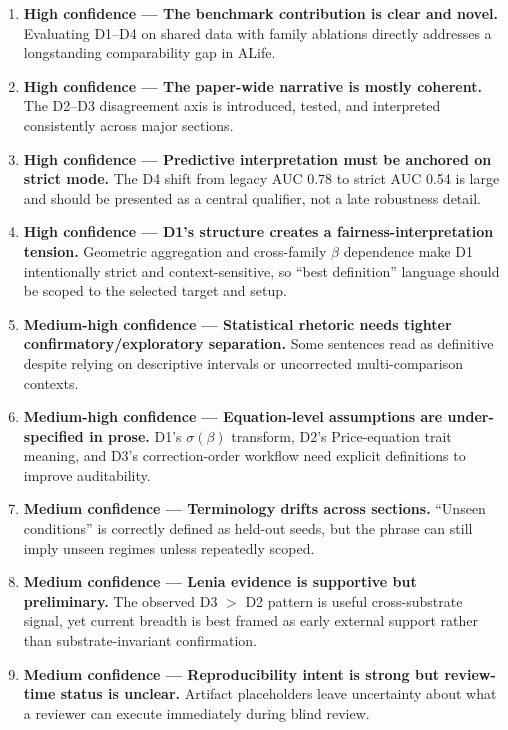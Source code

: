 \documentclass[11pt]{article}
\begin{document}
\begin{enumerate}
  \item \textbf{High confidence --- The benchmark contribution is clear and novel.} Evaluating D1--D4 on shared data with family ablations directly addresses a longstanding comparability gap in ALife.

  \item \textbf{High confidence --- The paper-wide narrative is mostly coherent.} The D2--D3 disagreement axis is introduced, tested, and interpreted consistently across major sections.

  \item \textbf{High confidence --- Predictive interpretation must be anchored on strict mode.} The D4 shift from legacy AUC 0.78 to strict AUC 0.54 is large and should be presented as a central qualifier, not a late robustness detail.

  \item \textbf{High confidence --- D1's structure creates a fairness-interpretation tension.} Geometric aggregation and cross-family $\beta$ dependence make D1 intentionally strict and context-sensitive, so ``best definition'' language should be scoped to the selected target and setup.

  \item \textbf{Medium-high confidence --- Statistical rhetoric needs tighter confirmatory/exploratory separation.} Some sentences read as definitive despite relying on descriptive intervals or uncorrected multi-comparison contexts.

  \item \textbf{Medium-high confidence --- Equation-level assumptions are under-specified in prose.} D1's $\sigma(\beta)$ transform, D2's Price-equation trait meaning, and D3's correction-order workflow need explicit definitions to improve auditability.

  \item \textbf{Medium confidence --- Terminology drifts across sections.} ``Unseen conditions'' is correctly defined as held-out seeds, but the phrase can still imply unseen regimes unless repeatedly scoped.

  \item \textbf{Medium confidence --- Lenia evidence is supportive but preliminary.} The observed D3 $>$ D2 pattern is useful cross-substrate signal, yet current breadth is best framed as early external support rather than substrate-invariant confirmation.

  \item \textbf{Medium confidence --- Reproducibility intent is strong but review-time status is unclear.} Artifact placeholders leave uncertainty about what a reviewer can execute immediately during blind review.
\end{enumerate}
\end{document}
